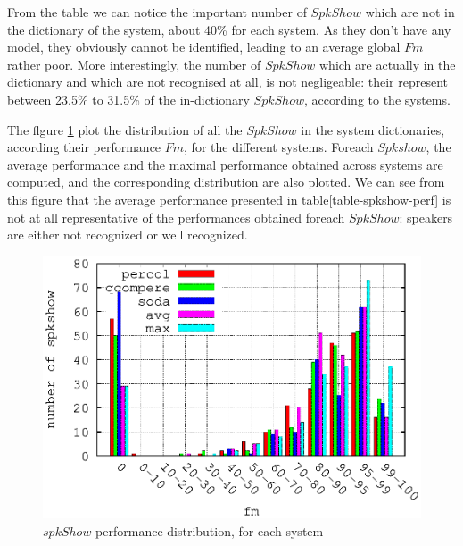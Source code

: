 From the table we can notice the important number of $SpkShow$ which are not in the dictionary of the system, about 40\% for each system. As they don't have any model, they obviously cannot be identified, leading to an average global $Fm$ rather poor. More interestingly, the number of $SpkShow$ which are actually in the dictionary and which are not recognised at all, is not negligeable: their represent between 23.5\% to 31.5\% of the in-dictionary $SpkShow$, according to the systems.


The flgure \ref{PQS} plot the distribution of all the $SpkShow$ in the system dictionaries, according their performance $Fm$, for the different systems. Foreach $Spkshow$, the average performance and the maximal performance obtained across systems are computed, and the corresponding distribution are also plotted. We can see from this figure that the average performance presented in table\ref{table-spkshow-perf} is not at all representative of the performances obtained foreach $SpkShow$: speakers are either not recognized or well recognized. 

\begin{figure}[!h]
\includegraphics[scale=0.6]{PQS-mono-model.eps}
\caption{$spkShow$ performance distribution, for each system}
\label{PQS}
\end{figure}


